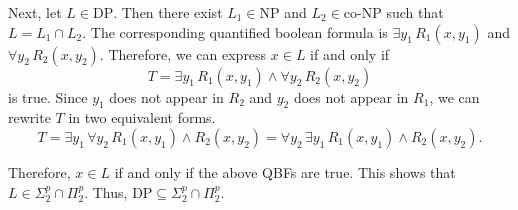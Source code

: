 \begin{enumerate}[(a)]
        Next, let $L\in \text{DP}$. Then there exist $L_1\in \text{NP}$ and $L_2\in \text{co-NP}$ such that $L = L_1\cap L_2$. The corresponding quantified boolean formula is $\exists y_1\, R_1(x,y_1)$ and $\forall y_2\, R_2(x,y_2)$. Therefore, we can express $x\in L$ if and only if
        $$T = \exists y_1\, R_1(x,y_1) \wedge \forall y_2\, R_2(x,y_2)$$
        is true. Since $y_1$ does not appear in $R_2$ and $y_2$ does not appear in $R_1$, we can rewrite $T$ in two equivalent forms.
        $$T = \exists y_1\, \forall y_2\, R_1(x,y_1) \wedge R_2(x,y_2) =  \forall y_2\,\exists y_1\, R_1(x,y_1) \wedge R_2(x,y_2).$$

        Therefore, $x\in L$ if and only if the above QBFs are true. This shows that $L\in \Sigma_2^p \cap \Pi_2^p$. Thus, $\text{DP}\subseteq \Sigma_2^p \cap \Pi_2^p$.
\end{enumerate}